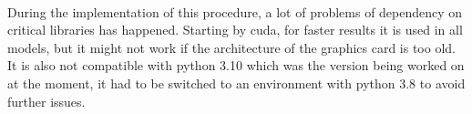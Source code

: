 \leavevmode\\
During the implementation of this procedure, a lot of problems of dependency on critical libraries has happened. Starting by cuda, for faster results it is used in all models, but it might not work if the architecture of the graphics card is too old. It is also not compatible with python 3.10 which was the version being worked on at the moment, it had to be switched to an environment with python 3.8 to avoid further issues.
\\

